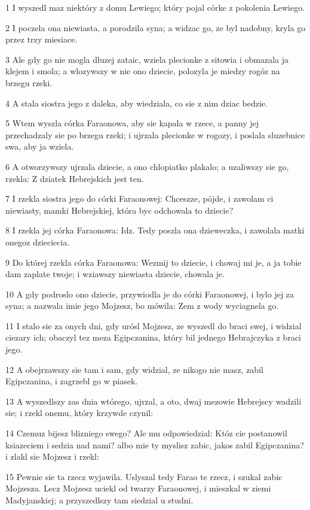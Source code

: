\par 1 I wyszedl maz niektóry z domu Lewiego; który pojal córke z pokolenia Lewiego.
\par 2 I poczela ona niewiasta, a porodzila syna; a widzac go, ze byl nadobny, kryla go przez trzy miesiace.
\par 3 Ale gdy go nie mogla dluzej zataic, wziela plecionke z sitowia i obmazala ja klejem i smola; a wlozywszy w nie ono dziecie, polozyla je miedzy rogóz na brzegu rzeki.
\par 4 A stala siostra jego z daleka, aby wiedziala, co sie z nim dziac bedzie.
\par 5 Wtem wyszla córka Faraonowa, aby sie kapala w rzece, a panny jej przechadzaly sie po brzegu rzeki; i ujrzala plecionke w rogozy, i poslala sluzebnice swa, aby ja wziela.
\par 6 A otworzywszy ujrzala dziecie, a ono chlopiatko plakalo; a uzaliwszy sie go, rzekla: Z dziatek Hebrejskich jest ten.
\par 7 I rzekla siostra jego do córki Faraonowej: Chceszze, pójde, i zawolam ci niewiasty, mamki Hebrejskiej, która byc odchowala to dziecie?
\par 8 I rzekla jej córka Faraonowa: Idz. Tedy poszla ona dzieweczka, i zawolala matki onegoz dzieciecia.
\par 9 Do której rzekla córka Faraonowa: Wezmij to dziecie, i chowaj mi je, a ja tobie dam zaplate twoje; i wziawszy niewiasta dziecie, chowala je.
\par 10 A gdy podroslo ono dziecie, przywiodla je do córki Faraonowej, i bylo jej za syna; a nazwala imie jego Mojzesz, bo mówila: Zem z wody wyciagnela go.
\par 11 I stalo sie za onych dni, gdy urósl Mojzesz, ze wyszedl do braci swej, i widzial ciezary ich; obaczyl tez meza Egipczanina, który bil jednego Hebrajczyka z braci jego.
\par 12 A obejrzawszy sie tam i sam, gdy widzial, ze nikogo nie masz, zabil Egipczanina, i zagrzebl go w piasek.
\par 13 A wyszedlszy zas dnia wtórego, ujrzal, a oto, dwaj mezowie Hebrejscy wadzili sie; i rzekl onemu, który krzywde czynil:
\par 14 Czemuz bijesz blizniego swego? Ale mu odpowiedzial: Któz cie postanowil ksiazeciem i sedzia nad nami? albo mie ty myslisz zabic, jakos zabil Egipczanina? i zlakl sie Mojzesz i rzekl:
\par 15 Pewnie sie ta rzecz wyjawila. Uslyszal tedy Farao te rzecz, i szukal zabic Mojzesza. Lecz Mojzesz uciekl od twarzy Faraonowej, i mieszkal w ziemi Madyjanskiej; a przyszedlszy tam siedzial u studni.

